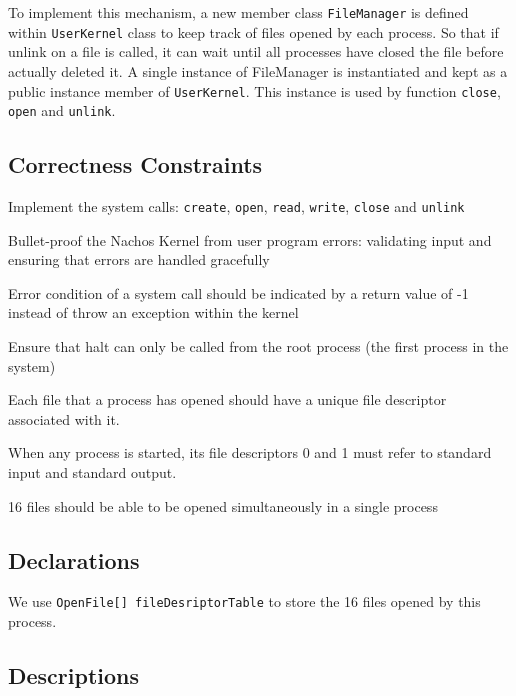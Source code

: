 \documentclass{article}
\begin{document}
\begin{spacing}{1.1}
To implement this mechanism, a new member class \texttt{FileManager} is defined within \texttt{UserKernel} class to keep track of files opened by each process. So that if unlink on a file is called, it can wait until all processes have closed the file before actually deleted it. A single instance of FileManager is instantiated and kept as a public instance member of \texttt{UserKernel}. This instance is used by function \texttt{close}, \texttt{open} and \texttt{unlink}.



\subsection{Correctness Constraints}

\begin{asparaitem}
\item Implement the system calls: \texttt{create}, \texttt{open}, \texttt{read}, \texttt{write}, \texttt{close} and \texttt{unlink}
\item Bullet-proof the Nachos Kernel from user program errors: validating input and ensuring that errors are handled gracefully
\item Error condition of a system call should be indicated by a return value of -1 instead of throw an exception within the kernel
\item Ensure that halt can only be called from the root process (the first process in the system)
\item Each file that a process has opened should have a unique file descriptor associated with it.
\item When any process is started, its file descriptors 0 and 1 must refer to standard input and standard output.
\item 16 files should be able to be opened simultaneously in a single process
\end{asparaitem}

\subsection{Declarations}

We use \texttt{OpenFile[] fileDesriptorTable} to store the 16 files opened by this process.

\subsection{Descriptions}


\end{spacing}
\end{document}
